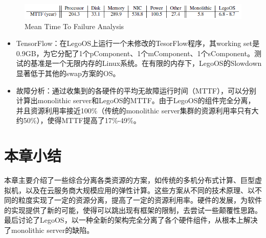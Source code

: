 \begin{figure}[h]
\centering
\includegraphics[scale=0.75]{Figures/legoos/failure_analysis.png}
\decoRule
\caption{Mean Time To Failure Analysis}
\label{fig:failure_analysis}
\end{figure}

\begin{itemize}
\item TensorFlow：在LegoOS上运行一个未修改的TesorFlow程序，其working set是0.9GB，为它分配了1个pComponent、1个mComponent、1个sComponent。测试的基准是一个无限内存的Linux系统。在有限的内存下，LegoOS的Slowdown显著低于其他的swap方案的OS。
\item 故障分析：通过收集到的各硬件的平均无故障运行时间（MTTF），可以分别计算出monolithic server和LegoOS的MTTF。由于LegoOS的组件完全分离，并且资源利用率接近100\%（传统的monolithic server集群的资源利用率只有大约50\%），使得MTTF提高了17\%-49\%。
\end{itemize}


\section{本章小结}

本章主要介绍了一些综合分离各类资源的方案，如传统的多机分布式计算、巨型虚拟机，以及在云服务商大规模应用的弹性计算。这些方案从不同的技术原理、以不同的粒度实现了一定的资源分离，提高了一定的资源利用率。硬件的发展，为软件的实现提供了新的可能，使得可以跳出现有框架的限制，去尝试一些颠覆性思路。最后讨论了LegoOS，以一种全新的架构完全分离了各个硬件组件，从根本上解决了monolithic server的缺陷。
